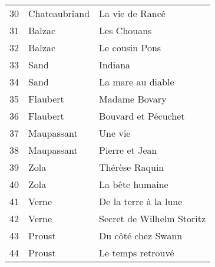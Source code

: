 \begin{table}[H]
\begin{tabular}{l l l}
    30 & Chateaubriand & La vie de Rancé \\
    31 & Balzac & Les Chouans \\
    32 & Balzac & Le cousin Pons \\
    33 & Sand & Indiana \\
    34 & Sand & La mare au diable \\
    35 & Flaubert & Madame Bovary \\
    36 & Flaubert & Bouvard et Pécuchet \\
    37 & Maupassant & Une vie \\
    38 & Maupassant & Pierre et Jean \\
    39 & Zola & Thérèse Raquin \\
    40 & Zola & La bête humaine \\
    41 & Verne & De la terre à la lune \\
    42 & Verne & Secret de Wilhelm Storitz \\
    43 & Proust & Du côté chez Swann \\
    44 & Proust & Le temps retrouvé \\
    \bottomrule
  \end{tabular}
\end{table}

